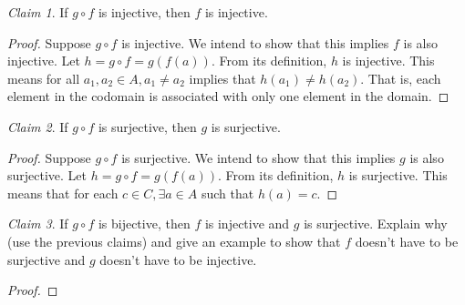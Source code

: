 \documentclass[12pt,oneside]{amsart}
\theoremstyle{remark}
\newtheorem{claim}{Claim}[exer]
\begin{document}
\begin{claim}
If $g \circ f$ is injective, then $f$ is injective.
\end{claim}
\begin{proof}
Suppose $g \circ f$ is injective. We intend to show that this implies $f$ is also injective. Let $h = g \circ f = g(f(a))$. From its definition, $h$ is injective. This means for all $a_1, a_2 \in A, a_1 \neq a_2$ implies that $h(a_1) \neq h(a_2)$. That is, each element in the codomain is associated with only one element in the domain.
\end{proof}

\begin{claim}
If $g \circ f$ is surjective, then $g$ is surjective.
\end{claim}
\begin{proof}
Suppose $g \circ f$ is surjective. We intend to show that this implies $g$ is also surjective. Let $h = g \circ f = g(f(a))$. From its definition, $h$ is surjective. This means that for each $c \in C, \exists a \in A$ such that $h(a) = c$.
\end{proof}

\begin{claim}
If $g \circ f$ is bijective, then $f$ is injective and $g$ is surjective. Explain why (use the previous claims) and give an example to show that $f$ doesn’t have to be surjective and $g$ doesn’t have to be injective.
\end{claim}
\begin{proof}
\end{proof}
\end{document}
